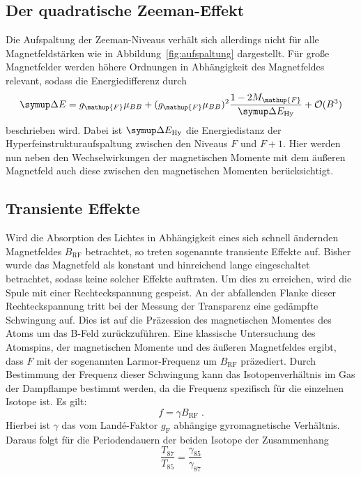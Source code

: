 \subsection{Der quadratische Zeeman-Effekt}

Die Aufspaltung der Zeeman-Niveaus verhält sich allerdings nicht für alle Magnetfeldstärken wie in Abbildung~\ref{fig:aufspaltung} dargestellt. Für große Magnetfelder werden höhere Ordnungen in Abhängigkeit des Magnetfeldes relevant, sodass die Energiedifferenz durch
%
\begin{equation}
    \upD E = g_{\mathup{F}}\mu_{BB} + (g_{\mathup{F}}\mu_{BB})^2\frac{1-2M_{\mathup{F}}}{\upD E_{\text{Hy}}} + \mathcal{O}(B^3)
  \label{eq:quad_zeeman}
\end{equation}
%
beschrieben wird. Dabei ist $\upD E_{\text{Hy}}$ die Energiedistanz der Hyperfeinstrukturaufspaltung zwischen den Niveaus $F$ und $F+1$. Hier werden nun neben den Wechselwirkungen der magnetischen Momente mit dem äußeren Magnetfeld auch diese zwischen den magnetischen Momenten berücksichtigt.

\subsection{Transiente Effekte}

Wird die Absorption des Lichtes in Abhängigkeit eines sich
schnell ändernden Magnetfeldes $B_{\text{RF}}$ betrachtet, so treten sogenannte
transiente Effekte auf. Bisher wurde das Magnetfeld als konstant und hinreichend
lange eingeschaltet betrachtet, sodass keine solcher Effekte auftraten. Um dies
zu erreichen, wird die Spule mit einer Rechteckspannung gespeist. An der
abfallenden Flanke dieser Rechteckspannung tritt bei der Messung der Transparenz
eine gedämpfte Schwingung auf. Dies ist auf die Präzession des magnetischen
Momentes des Atoms um das B-Feld zurückzuführen. Eine klassische Untersuchung
des Atomspins, der magnetischen Momente und des äußeren Magnetfeldes ergibt,
dass $F$ mit der sogenannten Larmor-Frequenz um $B_{\text{RF}}$ präzediert. Durch
Bestimmung der Frequenz dieser Schwingung kann das Isotopenverhältnis im Gas der
Dampflampe bestimmt werden, da die Frequenz spezifisch für die einzelnen Isotope
ist. Es gilt:
%
\begin{equation}
    f=\gamma B_{\text{RF}} \; .
\end{equation}
%
Hierbei ist $\gamma$ das vom Landé-Faktor $g_\text{F}$ abhängige gyromagnetische
Verhältnis. Daraus folgt für die Periodendauern der beiden Isotope der
Zusammenhang
%
\begin{equation}
  \frac{T_{87}}{T_{85}}=\frac{\gamma_{85}}{\gamma_{87}}
\end{equation}
